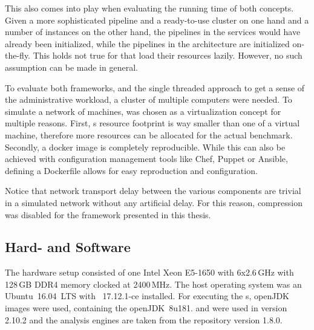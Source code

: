 This also comes into play when evaluating the running time of both concepts. Given a more sophisticated pipeline and a ready-to-use \spark{} cluster on one hand and a number of \uimaas{} instances on the other hand, the pipelines in the \uimaas{} services would have already been initialized, while the pipelines in the \spark{} architecture are initialized on-the-fly. This holds not true for \anens{} that load their resources lazily. However, no such assumption can be made in general.

To evaluate both frameworks, and the single threaded approach to get a sense of the administrative workload, a cluster of multiple computers were needed. To simulate a network of machines, \docker{} was chosen as a virtualization concept for multiple reasons. First, \docker{}s resource footprint is way smaller than one of a virtual machine, therefore more resources can be allocated for the actual benchmark. Secondly, a docker image is completely reproducible. While this can also be achieved with configuration management tools like Chef, Puppet or Ansible, defining a Dockerfile allows for easy reproduction and configuration. 

Notice that network transport delay between the various components are trivial in a simulated network without any artificial delay. For this reason, compression was disabled for the framework presented in this thesis.

\subsection{Hard- and Software}
The hardware setup consisted of one Intel Xeon E5-1650 with 6x2.6\,GHz with 128\,GB DDR4 memory clocked at 2400\,MHz. The host operating system was an Ubuntu~16.04~LTS with \docker{}~17.12.1-ce installed. For executing the \jvm{}s, openJDK \docker{} images were used, containing the openJDK~8u181. \uima{} and \uimaas{} were used in version 2.10.2 and the \dkpro{} analysis engines are taken from the repository version 1.8.0.

